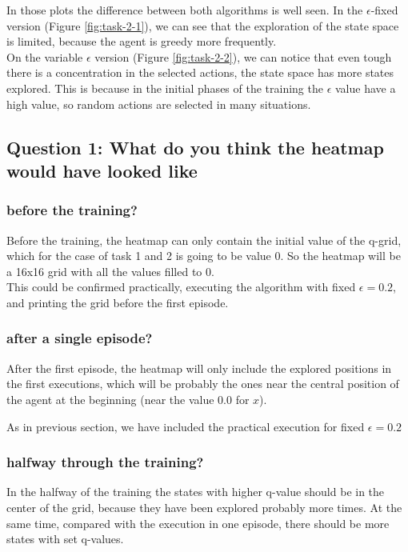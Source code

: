 \documentclass[12pt]{article}
\begin{document}
In those plots the difference between both algorithms is well seen. In the $\epsilon$-fixed version (Figure \ref{fig:task-2-1}), we can see that the exploration of the state space is limited, because the agent is greedy more frequently.\\

On the variable $\epsilon$ version (Figure \ref{fig:task-2-2}), we can notice that even tough there is a concentration in the selected actions, the state space has more states explored. This is because in the initial phases of the training the $\epsilon$ value have a high value, so random actions are selected in many situations.

\subsection{Question 1: What do you think the heatmap would have looked like}

\subsubsection{before the training?}

Before the training, the heatmap can only contain the initial value of the q-grid, which for the case of task 1 and 2 is going to be value 0. So the heatmap will be a 16x16 grid with all the values filled to 0. \\

This could be confirmed practically, executing the algorithm with fixed $\epsilon = 0.2$, and printing the grid before the first episode.

\subsubsection{after a single episode?}

After the first episode, the heatmap will only include the explored positions in the first executions, which will be probably the ones near the central position of the agent at the beginning (near the value 0.0 for $x$).

As in previous section, we have included the practical execution for fixed $\epsilon=0.2$

\subsubsection{halfway through the training?}

In the halfway of the training the states with higher q-value should be in the center of the grid, because they have been explored probably more times. At the same time, compared with the execution in one episode, there should be more states with set q-values.\\
\end{document}
